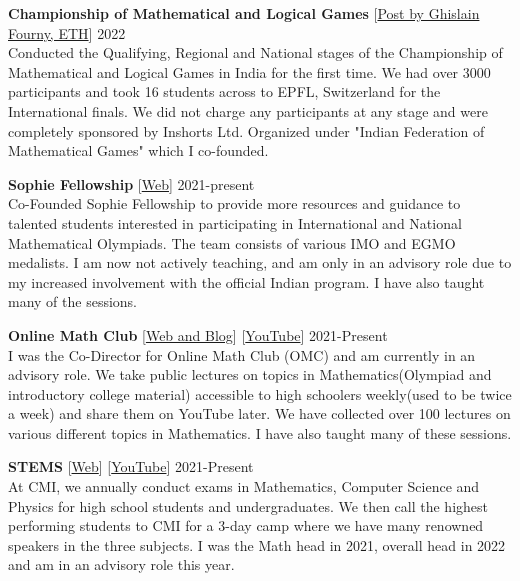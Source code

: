\documentclass[margin,line, 10pt]{res}
\begin{document}
\begin{resume}
{\bf Championship of Mathematical and Logical Games} {\hspace{1em} [\href{https://www.linkedin.com/posts/ghislainfourny_hamen-bahut-bahut-badhia-laga-ki-pahle-baar-activity-6969912358307536896--pLr?utm_source=share&utm_medium=member_desktop}{Post by Ghislain Fourny, ETH}]} \hfill 2022\\
Conducted the Qualifying, Regional and National stages of the Championship of Mathematical and Logical Games in India for the first time. We had over 3000 participants and took 16 students across to EPFL, Switzerland for the International finals. We did not charge any participants at any stage and were completely sponsored by Inshorts Ltd. Organized under "Indian Federation of Mathematical Games" which I co-founded. 

{\bf Sophie Fellowship}{\hspace{1em} [\href{https://www.sophiefellowship.in/}{Web}]}  \hfill 2021-present\\
Co-Founded Sophie Fellowship to provide more resources and guidance to talented students interested in participating in International and National Mathematical Olympiads. The team consists of various IMO and EGMO medalists. I am now not actively teaching, and am only in an advisory role due to my increased involvement with the official Indian program. I have also taught many of the sessions.

{\textbf {Online Math Club}}{ \hspace{1em} [\href{https://omath.club/}{Web and Blog}] \hspace{0.4em} [\href{https://www.youtube.com/@OMath/videos}{YouTube}]} \hfill 2021-Present\\
I was the Co-Director for Online Math Club (OMC) and am currently in an advisory role. We take public lectures on topics in Mathematics(Olympiad and introductory college material) accessible to high schoolers weekly(used to be twice a week) and share them on YouTube later. We have collected over 100 lectures on various different topics in Mathematics.  I have also taught many of these sessions.

{\bf STEMS}{\hspace{1em} [\href{https://www.tessellate.cmi.ac.in/stems}{Web}]\hspace{0.4em} [\href{https://www.youtube.com/@TessellateCMI}{YouTube}]} \hfill 2021-Present\\
At CMI, we annually conduct exams in Mathematics, Computer Science and Physics for high school students and undergraduates. We then call the highest performing students to CMI for a 3-day camp where we have many renowned speakers in the three subjects. I was the Math head in 2021, overall head in 2022 and am in an advisory role this year.


\end{resume}
\end{document}
